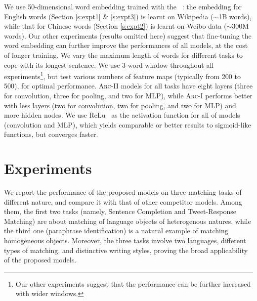 \documentclass{article} %
\begin{document}
We use 50-dimensional word embedding trained with the ~\cite{word2vec}: the embedding for English words (Section \ref{s:expt1} \& \ref{s:expt3}) is learnt on Wikipedia ($\sim$1B words), while that for Chinese words (Section \ref{s:expt2}) is learnt on Weibo data ($\sim$300M words). Our other experiments (results omitted here) suggest that fine-tuning the word embedding can further improve the performances of all models, at the cost of longer training. We vary the maximum length of words for different tasks to cope with its longest sentence. We use 3-word window throughout all experiments\footnote{Our other experiments suggest that the performance can be further increased with wider windows.}, but test various numbers of feature maps (typically from 200 to 500), for optimal performance. \textsc{Arc-II} models for all tasks have eight layers (three for convolution, three for pooling, and two for MLP), while \textsc{Arc-I} performs better with less layers (two for convolution, two for pooling, and two for MLP) and more hidden nodes.  We use ReLu~\cite{relu} as the activation function for all of models (convolution and MLP), which yields comparable or better results to sigmoid-like functions, but converges faster. \vspace{-10pt}

\section{Experiments} \label{s:expts} \vspace{-10pt}
We report the performance of the proposed models on three matching tasks of different nature, and compare it with that of other competitor models. Among them, the first two tasks (namely, Sentence Completion and Tweet-Response Matching) are about matching of language objects of heterogenous natures, while the third one (paraphrase identification) is a natural example of matching homogeneous objects. Moreover, the three tasks involve two languages, different types of matching, and distinctive writing styles, proving the broad applicability of the proposed models. \vspace{-10pt}
\end{document}
